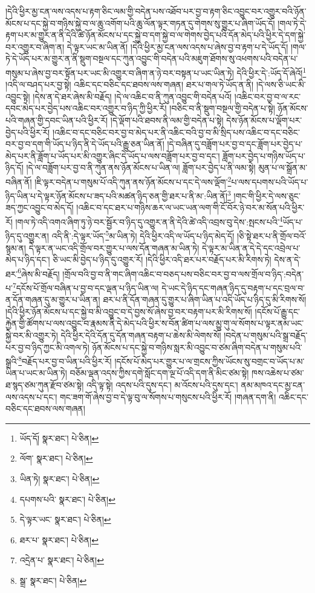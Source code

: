།དེའི་ཕྱིར་མྱ་ངན་ལས་འདས་པ་རྟག་ཅིང་ལམ་གྱི་བདེན་པས་འཐོབ་པར་བྱ་བ་རྟག་ཅིང་འབྱུང་བར་འགྱུར་བའི་ཉོན་མོངས་པ་དང་སྐྱེ་བ་གཉིས་སྐྱེ་བ་ལ་ཆུ་འགོག་པའི་ཆུ་ལོན་ལྟར་གཏན་དུ་གེགས་སུ་གྱུར་པ་ཞིག་ཡོད་དོ། །གལ་ཏེ་དེ་རྟག་པར་མ་གྱུར་ན་ནི་དེའི་ཚེ་ཉོན་མོངས་པ་དང་སྐྱེ་བ་དག་སྐྱེ་བ་ལ་གེགས་བྱེད་པའི་དོན་མེད་པའི་ཕྱིར་དེ་དག་སྐྱེ་བར་འགྱུར་བ་ཞིག་ན། དེ་ལྟར་ཡང་མ་ཡིན་ནོ། །དེའི་ཕྱིར་མྱ་ངན་ལས་འདས་པ་ཞེས་བྱ་བ་རྟག་པ་དེ་ཡོད་དོ། །གལ་ཏེ་དེ་ཡོད་པར་མ་གྱུར་ན་ནི་སྡུག་བསྔལ་དང་ཀུན་འབྱུང་གི་བདེན་པའི་མཇུག་ཐོགས་སུ་འཕགས་པའི་བདེན་པ་གསུམ་པ་ཞེས་བྱ་བར་སྟོན་པར་ཡང་མི་འགྱུར་བ་ཞིག་ན་ཉེ་བར་བསྟན་པ་ཡང་ཡིན་ཏེ། དེའི་ཕྱིར་དེ་:ཡོད་དོ་ཞེའོ།\footnote{ཡོད་དོ།  སྣར་ཐང་།  པེ་ཅིན། } །འདི་ལ་བཤད་པར་བྱ་སྟེ། འཆིང་དང་བཅིང་དང་ཐབས་ལས་གཞན། ཐར་པ་གལ་ཏེ་ཡོད་ན་ནི། །དེ་ལས་ཅི་ཡང་མི་འབྱུང་སྟེ། །དེས་ན་དེ་ཐར་ཞེས་མི་བརྗོད། །དེ་ལ་འཆིང་བ་ནི་ཀུན་འབྱུང་གི་བདེན་པའོ། །འཆིང་བར་བྱ་བ་ལ་རང་དབང་མེད་པར་བྱེད་པས་འཆིང་བར་འགྱུར་བ་ཉིད་ཀྱི་ཕྱིར་རོ། །བཅིང་བ་ནི་སྡུག་བསྔལ་གྱི་བདེན་པ་སྟེ། ཉོན་མོངས་པའི་གཞན་གྱི་དབང་ཡིན་པའི་ཕྱིར་རོ། །དེ་ལྡོག་པའི་ཐབས་ནི་ལམ་གྱི་བདེན་པ་སྟེ། དེས་ཉོན་མོངས་པ་ལྡོག་པར་བྱེད་པའི་ཕྱིར་རོ། །འཆིང་བ་དང་བཅིང་བར་བྱ་བ་མེད་པར་ནི་འཆིང་བའི་བྱ་བ་མི་སྲིད་པས་འཆིང་བ་དང་བཅིང་བར་བྱ་བ་དག་གི་ཡོད་པ་ཉིད་ནི་དེ་ཡོད་པའི་རྒྱུ་ཅན་ཡིན་ནོ། །དེ་བཞིན་དུ་བཟློག་པར་བྱ་བ་དང་ཟློག་པར་བྱེད་པ་མེད་པར་ནི་ཟློག་པ་ཡོད་པར་མི་འགྱུར་ཞིང་དེ་ཡོད་པ་ལས་བཟློག་པར་བྱ་བ་དང་། ཟློག་པར་བྱེད་པ་གཉིས་ཡོད་པ་ཉིད་དོ། །དེ་ལ་བཟློག་པར་བྱ་བ་ནི་ཀུན་ནས་ཉོན་མོངས་པ་ཡིན་ལ། ཟློག་པར་བྱེད་པ་ནི་ལམ་སྟེ། མུན་པ་ལ་སྒྲོན་མ་བཞིན་ནོ། །ཇི་ལྟར་བདེན་པ་གསུམ་པོ་འདི་ཀུན་ནས་ཉོན་མོངས་པ་དང་དེ་ལས་ལྡོག་\footnote{ལོག་  སྣར་ཐང་།  པེ་ཅིན། }པ་ལས་དཔགས་པའི་ཡོད་པ་ཉིད་ཡིན་པ་དེ་ལྟར་ཉོན་མོངས་པ་ཟད་པའི་མཚན་ཉིད་ཅན་གྱི་ཐར་པ་ནི་མ་:ཡིན་ནོ།\footnote{ཡིན་ཏེ།  སྣར་ཐང་།  པེ་ཅིན། } །གང་གི་ཕྱིར་དེ་ལས་ཅུང་ཟད་ཀྱང་འབྱུང་བ་མེད་དོ། །འཆིང་བ་དང་ཐར་པ་གཉིས་ཆར་ལ་ཡང་ཡན་ལག་གི་ངོ་བོར་ཉེ་བར་མ་སོན་པའི་ཕྱིར་རོ། །གལ་ཏེ་འདི་འགའ་ཞིག་ཏུ་ཉེ་བར་སྦྱོར་བ་ཉིད་དུ་འགྱུར་ན་ནི་དེའི་ཚེ་འདི་འབྲས་བུ་དེས་:སྤངས་པའི་\footnote{དཔགས་པའི་  སྣར་ཐང་།  པེ་ཅིན། }ཡོད་པ་ཉིད་དུ་འགྱུར་ན། འདི་ནི་:དེ་ལྟར་ཡོད་\footnote{དེ་ལྟར་ཡང་  སྣར་ཐང་།  པེ་ཅིན། }མ་ཡིན་ཏེ། དེའི་ཕྱིར་འདི་ལ་ཡོད་པ་ཉིད་མེད་དོ། །ཅི་སྟེ་ཐར་པ་ནི་གྲོལ་བའོ་སྙམ་ན། དེ་ལྟར་ན་ཡང་འདི་གྲོལ་བར་གྱུར་པ་ལས་དོན་གཞན་མ་ཡིན་ཏེ། དེ་ལྟར་མ་ཡིན་ན་དེ་དེ་དང་འབྲེལ་པ་མེད་པ་ཉིད་དང་། ཅི་ཡང་མི་བྱེད་པ་ཉིད་དུ་འགྱུར་རོ། །དེའི་ཕྱིར་འདི་ཐར་པར་བརྗོད་པར་མི་རིགས་ཏེ། དེས་ན་དེ་ཐར་\footnote{ཐར་པ་  སྣར་ཐང་།  པེ་ཅིན། }ཞེས་མི་བརྗོད། །གྲོལ་བའི་བྱ་བ་ནི་གང་ཞིག་འཆིང་བ་བཅད་པས་བཅིང་བར་བྱ་བ་ལས་གྲོལ་བ་ཉིད་:བདེན་པ་\footnote{འདྲེན་པ་  སྣར་ཐང་།  པེ་ཅིན། }དངོས་པོ་གྲོལ་བཞིན་པ་བྱ་བ་དང་ལྡན་པ་ཉིད་ཡིན་ལ། དེ་ཡང་དེ་ཉིད་དང་གཞན་ཉིད་དུ་བརྟག་པ་དང་བྲལ་བ་ན་དོན་གཞན་དུ་མ་གྱུར་པ་ཡིན་ན། ཐར་པ་ནི་དོན་གཞན་དུ་གྱུར་པ་ཞིག་ཡིན་པ་འདི་ཡོད་པ་ཉིད་དུ་མི་རིགས་སོ། །དེའི་ཕྱིར་ཉོན་མོངས་པ་དང་སྐྱེ་བ་མི་འབྱུང་བ་དེ་བྱས་སོ་ཞེས་བྱ་བར་བརྟག་པར་མི་རིགས་སོ། །དངོས་པོ་རྒྱུ་དང་རྐྱེན་གྱི་ཚོགས་པ་ལས་འབྱུང་བ་རྣམས་ནི་དེ་མེད་པའི་ཕྱིར་ས་བོན་ཚིག་པ་ལས་མྱུ་གུ་ལ་སོགས་པ་ལྟར་ནམ་ཡང་སྐྱེ་བར་མི་འགྱུར་ཏེ། དེའི་ཕྱིར་དེའི་དོན་དུ་དོན་གཞན་བརྟག་པ་ཆེས་མི་ལེགས་སོ། །བདེན་པ་གསུམ་པའི་སྒྲ་བརྗོད་པར་བྱ་བ་ཉིད་ཀྱང་མི་འགལ་ཏེ། ཉོན་མོངས་པ་དང་སྐྱེ་བ་གཉིས་སླར་མི་འབྱུང་བ་ཙམ་ཞིག་བདེན་པ་གསུམ་པའི་སྒྲའི་\footnote{སྒྲ་  སྣར་ཐང་།  པེ་ཅིན། }བརྗོད་པར་བྱ་བ་ཡིན་པའི་ཕྱིར་རོ། །དངོས་པོ་མེད་པར་གྱུར་པ་ལ་གྲངས་ཀྱིས་ཡོངས་སུ་བགྲང་བ་ཡོད་པ་མ་ཡིན་པ་ཡང་མ་ཡིན་ཏེ། བཅོམ་ལྡན་འདས་ཀྱིས་དགེ་སློང་དག་ལྔ་པོ་འདི་དག་ནི་མིང་ཙམ་སྟེ། ཁས་འཆེས་པ་ཙམ་ཐ་སྙད་ཙམ་ཀུན་རྫོབ་ཙམ་སྟེ། འདི་ལྟ་སྟེ། འདས་པའི་དུས་དང་། མ་འོངས་པའི་དུས་དང་། ནམ་མཁའ་དང་མྱ་ངན་ལས་འདས་པ་དང་། གང་ཟག་གོ་ཞེས་བྱ་བ་དེ་ལྟ་བུ་ལ་སོགས་པ་གསུངས་པའི་ཕྱིར་རོ། །གཞན་དག་ནི། འཆིང་དང་བཅིང་དང་ཐབས་ལས་གཞན། 
